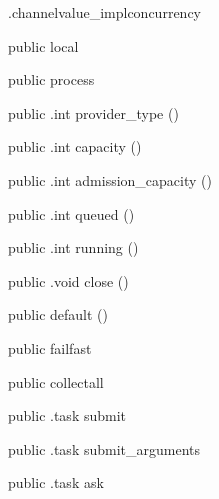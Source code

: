 \begin{CrexxClass}{.channelvalue\_impl}{concurrency}

  \begin{Hierarchy}
  \end{Hierarchy}

  \begin{Members}

    \Factory
      {public}
      {local}
      {}

    \Factory
      {public}
      {process}
      {}

    \Method
      {public}
      {.int}
      {provider\_type}
      {()}

    \Method
      {public}
      {.int}
      {capacity}
      {()}

    \Method
      {public}
      {.int}
      {admission\_capacity}
      {()}

    \Method
      {public}
      {.int}
      {queued}
      {()}

    \Method
      {public}
      {.int}
      {running}
      {()}

    \Method
      {public}
      {.void}
      {close}
      {()}

    \Factory
      {public}
      {default}
      {()}

    \Factory
      {public}
      {failfast}
      {}

    \Factory
      {public}
      {collectall}
      {}

    \Method
      {public}
      {.task}
      {submit}
      {}

    \Method
      {public}
      {.task}
      {submit\_arguments}
      {}

    \Method
      {public}
      {.task}
      {ask}
      {}


\end{Members}
\end{CrexxClass}
